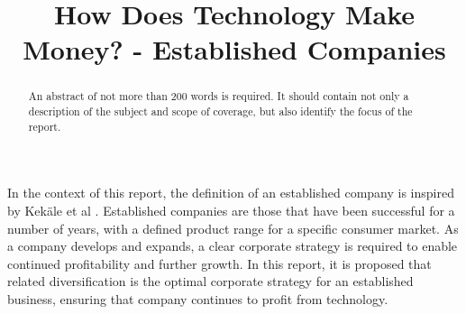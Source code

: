 \documentclass{elec6049Report}     %
\begin{document}
\frontmatter
{}
\title      {How Does Technology Make Money? - Established Companies}


\maketitle

\begin{abstract}
An abstract of not more than 200 words is required. It should contain not only a description of the subject and scope of coverage, but also identify the focus of the report.  
\end{abstract}

\mainmatter
{}

In the context of this report, the definition of an established company is inspired by Kek{\"a}le et al \cite{kekale2007successful}. 
Established companies are those that have been successful for a number of years, with a defined product range for a specific consumer market. 
As a company develops and expands, a clear corporate strategy is required to enable continued profitability and further growth.
In this report, it is proposed that related diversification is the optimal corporate strategy for an established business, ensuring that company continues to profit from technology.
\end{document}
